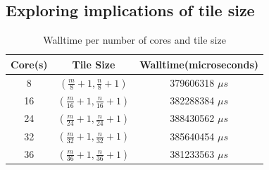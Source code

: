 \documentclass[manuscript,screen, nonacm=true]{acmart}
\begin{document}
\subsection{Exploring implications of tile size}

\begin{table}[!h]
    \begin{tabular}{||c|c|c||}
        \hline
        Core(s) & Tile Size & Walltime(microseconds) \\ \hline
        8       &  $(\frac{m}{8} + 1, \frac{n}{8}+1)$  & 379606318 $\mu s$ \\ 
        \hline
        16       &  $(\frac{m}{16}+1, \frac{n}{16}+1)$  & 382288384 $\mu s$ \\
        \hline
        24       &  $(\frac{m}{24}+1, \frac{n}{24}+1)$  & 388430562 $\mu s$ \\
        \hline
        32     &  $(\frac{m}{32}+1, \frac{n}{32}+1)$ & 385640454 $\mu s$ \\
        \hline
        36      & $(\frac{m}{36}+1, \frac{n}{36}+1)$ & 381233563 $\mu s$ \\
        \hline
    \end{tabular}
    \label{table:tileresults}
    \caption{Walltime per number of cores and tile size}
\end{table}
\end{document}
